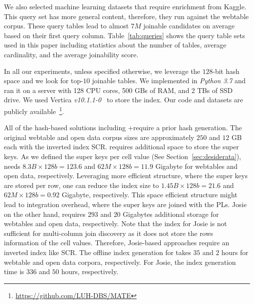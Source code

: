We also selected machine learning datasets that require enrichment from Kaggle. This query set has more general content, therefore, they run against the webtable corpus. These query tables lead to almost $7M$ joinable candidates on average based on their first query column. Table~\ref{tab:queries} shows the query table sets used in this paper including statistics about the number of tables, average cardinality, and the average joinability score.

In all our experiments, unless specified otherwise, we leverage the $128$-bit hash space and we look for top-$10$ joinable tables.
We implemented \system in \textit{Python 3.7} and ran it on a server with 128 CPU cores, 500 GBs of RAM, and 2 TBs of SSD drive. 
We used Vertica \textit{v10.1.1-0}~\cite{lamb2012vertica} to store the index.
Our code and datasets are publicly available~\footnote{\url{https://github.com/LUH-DBS/MATE}}.

All of the hash-based solutions including \system+\hash require a prior hash generation. 
The original webtable and open data corpus sizes are approximately $250$ and $12$ GB each with the inverted index SCR.
\system requires additional space to store the super keys. As we defined the super keys per cell value (See Section~\ref{sec:desiderata}), \system needs $8.3B \times 128b = 123.6$ and $62M \times 128b = 11.9$ Gigabyte for webtables and open data, respectively.
Leveraging more efficient structure, where the super keys are stored per row, one can reduce the index size to $1.45B \times 128b = 21.6$ and $62M \times 128b = 0.92$ Gigabyte, respectively. This space efficient structure might lead to integration overhead, where the super keys are joined with the PLs.
Josie on the other hand, requires $293$ and $20$ Gigabytes additional storage for webtables and open data, respectively. Note that the index for Josie is not sufficient for multi-column join discovery as it does not store the rows information of the cell values. Therefore, Josie-based approaches require an inverted index like SCR. 
The offline index generation for \system takes $35$ and $2$ hours for webtable and open data corpora, respectively. For Josie, the index generation time is $336$ and $50$ hours, respectively.

